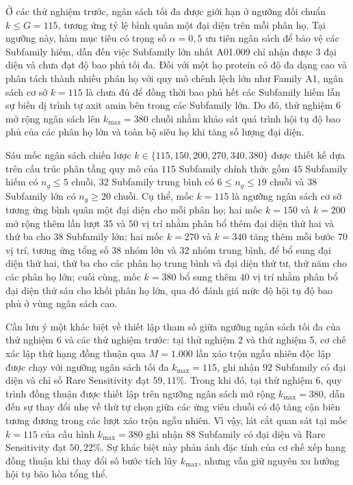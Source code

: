 \label{subsec:branch6_deep_budget}

Ở các thử nghiệm trước, ngân sách tối đa được giới hạn ở ngưỡng đối chuẩn $k \le G = 115$, tương ứng tỷ lệ bình quân một đại diện trên mỗi phân họ. Tại ngưỡng này, hàm mục tiêu có trọng số $\alpha = 0{,}5$ ưu tiên ngân sách để bảo vệ các Subfamily hiếm, dẫn đến việc Subfamily lớn nhất A01.009 chỉ nhận được $3$ đại diện và chưa đạt độ bao phủ tối đa. Đối với một họ protein có độ đa dạng cao và phân tách thành nhiều phân họ với quy mô chênh lệch lớn như Family A1, ngân sách cơ sở $k = 115$ là chưa đủ để đồng thời bao phủ hết các Subfamily hiếm lẫn sự biến dị trình tự axit amin bên trong các Subfamily lớn. Do đó, thử nghiệm 6 mở rộng ngân sách lên $k_{\max} = 380$ chuỗi nhằm khảo sát quá trình hội tụ độ bao phủ của các phân họ lớn và toàn bộ siêu họ khi tăng số lượng đại diện.

Sáu mốc ngân sách chiến lược $k \in \{115, 150, 200, 270, 340, 380\}$ được thiết kế dựa trên cấu trúc phân tầng quy mô của $115$ Subfamily chính thức gồm $45$ Subfamily hiếm có $n_g \le 5$ chuỗi, $32$ Subfamily trung bình có $6 \le n_g \le 19$ chuỗi và $38$ Subfamily lớn có $n_g \ge 20$ chuỗi. Cụ thể, mốc $k = 115$ là ngưỡng ngân sách cơ sở tương ứng bình quân một đại diện cho mỗi phân họ; hai mốc $k = 150$ và $k = 200$ mở rộng thêm lần lượt $35$ và $50$ vị trí nhằm phân bổ thêm đại diện thứ hai và thứ ba cho $38$ Subfamily lớn; hai mốc $k = 270$ và $k = 340$ tăng thêm mỗi bước $70$ vị trí, tương ứng tổng số $38$ nhóm lớn và $32$ nhóm trung bình, để bổ sung đại diện thứ hai, thứ ba cho các phân họ trung bình và đại diện thứ tư, thứ năm cho các phân họ lớn; cuối cùng, mốc $k = 380$ bổ sung thêm $40$ vị trí nhằm phân bổ đại diện thứ sáu cho khối phân họ lớn, qua đó đánh giá mức độ hội tụ độ bao phủ ở vùng ngân sách cao.

Cần lưu ý một khác biệt về thiết lập tham số giữa ngưỡng ngân sách tối đa của thử nghiệm 6 và các thử nghiệm trước: tại thử nghiệm 2 và thử nghiệm 5, cơ chế xác lập thứ hạng đồng thuận qua $M = 1.000$ lần xáo trộn ngẫu nhiên độc lập được chạy với ngưỡng ngân sách tối đa $k_{\max} = 115$, ghi nhận $92$ Subfamily có đại diện và chỉ số Rare Sensitivity đạt $59{,}11\%$. Trong khi đó, tại thử nghiệm 6, quy trình đồng thuận được thiết lập trên ngưỡng ngân sách mở rộng $k_{\max} = 380$, dẫn đến sự thay đổi nhẹ về thứ tự chọn giữa các ứng viên chuỗi có độ tăng cận biên tương đương trong các lượt xáo trộn ngẫu nhiên. Vì vậy, lát cắt quan sát tại mốc $k = 115$ của cấu hình $k_{\max} = 380$ ghi nhận $88$ Subfamily có đại diện và Rare Sensitivity đạt $50{,}22\%$. Sự khác biệt này phản ánh đặc tính của cơ chế xếp hạng đồng thuận khi thay đổi số bước tích lũy $k_{\max}$, nhưng vẫn giữ nguyên xu hướng hội tụ bão hòa tổng thể.

